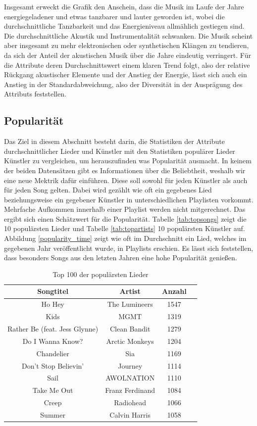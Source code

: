 \documentclass[conference]{IEEEtran}
\begin{document}
Insgesamt erweckt die Grafik den Anschein, dass die Musik im Laufe der Jahre energiegeladener und etwas tanzbarer und lauter geworden ist, wobei die durchschnittliche Tanzbarkeit und das Energieniveau allmählich gestiegen sind. Die durchschnittliche Akustik und Instrumentalität schwanken. Die Musik scheint aber insgesamt zu mehr elektronischen oder synthetischen Klängen zu tendieren, da sich der Anteil der akustischen Musik über die Jahre eindeutig verringert. Für die Attribute deren Durchschnittswert einem klaren Trend folgt, also der relative Rückgang akustischer Elemente und der Anstieg der Energie, lässt sich auch ein Anstieg in der Standardabweichung, also der Diversität in der Ausprägung des Attributs feststellen.

\subsection{Popularität}
Das Ziel in diesem Abschnitt besteht darin, die Statistiken der Attribute durchschnittlicher Lieder und Künstler mit den Statistiken populärer Lieder Künstler zu vergleichen, um herauszufinden was Popularität ausmacht.
In keinem der beiden Datensätzen gibt es Informationen über die Beliebtheit, weshalb wir eine neue Mektrik dafür einführen. Diese soll sowohl für jeden Künstler als auch für jeden Song gelten. Dabei wird gezählt wie oft ein gegebenes Lied beziehungsweise ein gegebener Künstler in unterschiedlichen Playlisten vorkommt. Mehrfache Aufkommen innerhalb einer Playlist werden nicht mitgerechnet. Das ergibt sich einen Schätzwert für die Popularität. Tabelle \eqref{tab:topsongs} zeigt die 10 populärsten Lieder und Tabelle \eqref{tab:topartists} 10 populärsten Künstler auf. Abbildung \eqref{popularity_time} zeigt wie oft im Durchschnitt ein Lied, welches im gegebenen Jahr veröffentlicht wurde, in Playlists erschien. Es lässt sich feststellen, dass besonders Songs aus den letzten Jahren eine hohe Popularität genießen.

\begin{table}[h]
\centering
\begin{tabular}{c c c c} 
\hline
Songtitel & Artist & Anzahl \\ [0.5ex] 
\hline
Ho Hey & The Lumineers & 1547 \\ 
Kids & MGMT & 1319 \\ 
Rather Be (feat. Jess Glynne) & Clean Bandit & 1279 \\ 
Do I Wanna Know? & Arctic Monkeys & 1204 \\ 
Chandelier & Sia & 1169 \\ 
Don't Stop Believin' & Journey & 1114 \\ 
Sail & AWOLNATION & 1110 \\ 
Take Me Out & Franz Ferdinand & 1084 \\ 
Creep & Radiohead & 1066 \\ 
Summer & Calvin Harris & 1058 \\ [1ex] 
\hline
\end{tabular}
\caption{Top 100 der populärsten Lieder}
\label{tab:topsongs}
\end{table}
\end{document}
